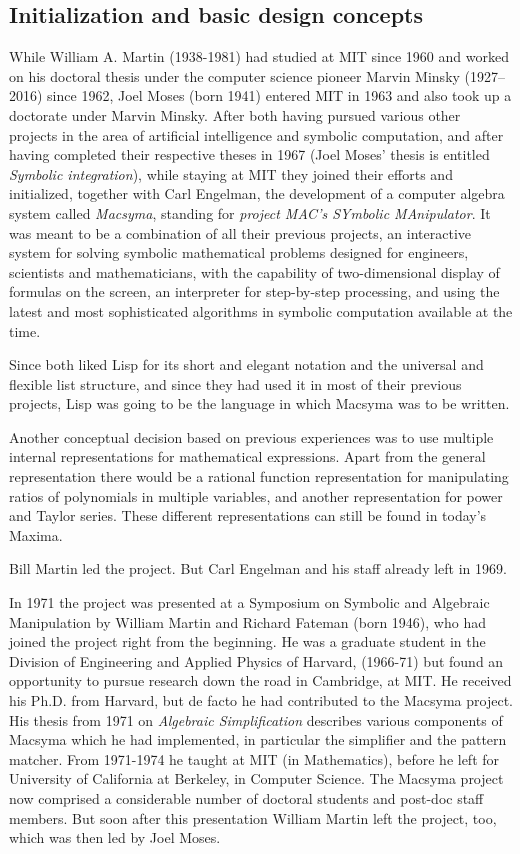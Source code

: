 \documentclass[../Maxima_Workbook.tex]{subfiles}
\begin{document}
\subsection{Initialization and basic design concepts}

While William A. Martin (1938-1981) had studied at MIT since 1960 and worked on his doctoral thesis under the computer science pioneer Marvin Minsky (1927–2016) since 1962, Joel Moses (born 1941) entered MIT in 1963 and also took up a doctorate under Marvin Minsky. After both having pursued various other projects in the area of artificial intelligence and symbolic computation, and after having completed their respective theses in 1967 (Joel Moses' thesis is entitled \emph{Symbolic integration}), while staying at MIT they joined their efforts and initialized, together with Carl Engelman, the development of a computer algebra system called \emph{Macsyma}, standing for \emph{project MAC's SYmbolic MAnipulator}. It was meant to be a combination of all their previous projects, an interactive system for solving symbolic mathematical problems designed for engineers, scientists and mathematicians, with the capability of two-dimensional display of formulas on the screen, an interpreter for step-by-step processing, and using the latest and most sophisticated algorithms in symbolic computation available at the time. 

\lz Since both liked Lisp for its short and elegant notation and the universal and flexible list structure, and since they had used it in most of their previous projects, Lisp was going to be the language in which Macsyma was to be written.

\lz Another conceptual decision based on previous experiences was to use multiple internal representations for mathematical expressions. Apart from the general representation there would be a rational function representation for manipulating ratios of polynomials in multiple variables, and another representation for power and Taylor series. These different representations can still be found in today's Maxima.

\lz Bill Martin led the project. But Carl Engelman and his staff already left in 1969.

\lz In 1971 the project was presented at a Symposium on Symbolic and Algebraic Manipulation by William Martin and Richard Fateman (born 1946), who had joined the project right from the beginning. He was a graduate student in the Division of Engineering and Applied Physics of Harvard, (1966-71) but found an opportunity to pursue research down the road in Cambridge, at MIT.
He received his Ph.D. from Harvard, but de facto he had contributed to the Macsyma project. His thesis from 1971 on \emph{Algebraic Simplification} describes various components of Macsyma which he had implemented, in particular the simplifier and the pattern matcher. From 1971-1974 he taught at MIT (in Mathematics), before he left for University of California at Berkeley, in Computer Science. The Macsyma project now comprised a considerable number of doctoral students and post-doc staff members. But soon after this presentation William Martin left the project, too, which was then led by Joel Moses.
\end{document}

